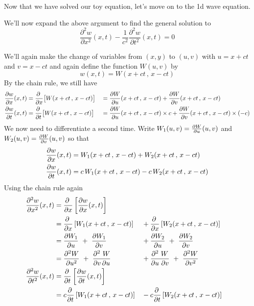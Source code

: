 Now that we have solved our toy equation, let's move on to the 1d
wave equation.

\begin{eg}
We'll now expand the above argument to find the general solution 
to 
\begin{equation*}
\frac{\partial^2 w}{\partial x^2}(x,t)
         -\frac{1}{c^2}\frac{\partial^2 w}{\partial t^2}(x,t)=0
\end{equation*}

 We'll again make the change of variables from $(x,y)$
to $(u,v)$ with $u=x+ct$ and $v=x-ct$ and again define
the function $W(u,v)$ by
\begin{equation*}
w(x,t) = W(x+ct\,,\,x-ct)
\end{equation*} 
By the chain rule, we still have
\begin{alignat*}{3}
\pdiff{w}{x}(x,t)
&=\pdiff{}{x}\big[W(x+ct\,,\,x-ct) \big]
&&= \pdiff{W}{u}(x+ct\,,\,x-ct) + \pdiff{W}{v}(x+ct\,,\,x-ct)  \\
\pdiff{w}{t}(x,t)
&=\pdiff{}{t}\big[W(x+ct\,,\,x-ct) \big]
&&= \pdiff{W}{u}(x+ct\,,\,x-ct)\times c 
             + \pdiff{W}{v}(x+ct\,,\,x-ct)\times(-c)  
\end{alignat*}
We now need to differentiate a second time. Write
$W_1(u,v)=\pdiff{W}{u}(u,v)$ and $W_2(u,v)=\pdiff{W}{v}(u,v)$
so that
\begin{align*}
\pdiff{w}{x}(x,t)
&= W_1(x+ct\,,\,x-ct) + W_2(x+ct\,,\,x-ct)  \\
\pdiff{w}{t}(x,t)
&= c\,W_1(x+ct\,,\,x-ct) -c\,W_2(x+ct\,,\,x-ct)
\end{align*}
Using the chain rule again
\begin{alignat*}{3}
\frac{\partial^2 w}{\partial x^2}(x,t)
&=\pdiff{}{x}\left[\pdiff{w}{x}(x,t)\right] \\
&=\pdiff{}{x}\left[W_1(x+ct\,,\,x-ct)\right]
  &&+ \pdiff{}{x}\left[W_2(x+ct\,,\,x-ct)\right] \\
&=\pdiff{W_1}{u}  
     \ +\  \pdiff{W_1}{v}
   &&+ \pdiff{W_2}{u}
     \ +\  \pdiff{W_2}{v}  \\
&=\frac{\partial^2 W}{\partial u^2}  
     \ +\  \frac{\partial^2\ W}{\partial v\,\partial u}
   &&+ \frac{\partial^2\ W}{\partial u\ \partial v}
     \ +\  \frac{\partial^2 W}{\partial v^2}  \\
\frac{\partial^2 w}{\partial t^2}(x,t)
&=\pdiff{}{t}\left[\pdiff{w}{t}(x,t)\right] \\
&=c\pdiff{}{t}\left[W_1(x+ct\,,\,x-ct)\right]
  &&-c \pdiff{}{t}\left[W_2(x+ct\,,\,x-ct)\right] \\

\end{alignat*}
\end{eg}
